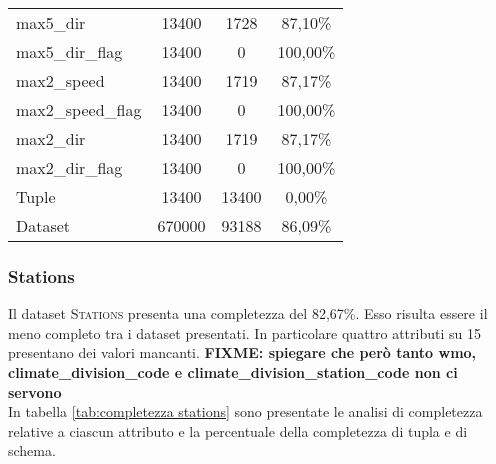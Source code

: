 \begin{longtable}{lccc}
		max5\_dir			& 13400 & 1728		 & 87,10\%		\\
		max5\_dir\_flag		& 13400 & 0		   	 & 100,00\%		\\	
		max2\_speed			& 13400 & 1719		 & 87,17\%		\\	
		max2\_speed\_flag	& 13400 & 0		   	 & 100,00\%		\\		
		max2\_dir			& 13400 & 1719		 & 87,17\%		\\
		max2\_dir\_flag		& 13400 & 0		   	 & 100,00\%		\\	
		\midrule
		Tuple 			& 13400  &	13400	 & 0,00\%		\\
		Dataset  		& 670000 &	93188 	 & 86,09\%		\\
		\bottomrule
		
	\end{longtable}
	\label{tab:completezza weather}

\subsubsection*{Stations}
Il dataset \textsc{Stations} presenta una completezza del 82,67\%. Esso risulta 
essere il meno completo tra i dataset presentati. In particolare quattro 
attributi su 15 presentano dei valori mancanti. \textbf{FIXME: spiegare che 
però tanto wmo, climate\_division\_code e climate\_division\_station\_code non 
ci 
servono}\\
In tabella \ref{tab:completezza stations} sono presentate le analisi di completezza relative a ciascun attributo e la percentuale della completezza di tupla e di schema.

